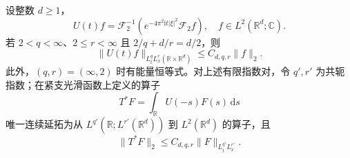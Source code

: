 \begin{theorem}\label{b2:thm:E-schrodinger-nonendpoint}
设整数 \(d\geq1\)，
\[
 U(t)f=\mathcal F_2^{-1}
       \left(e^{-4\pi^2\mathrm it|\xi|^2}\mathcal F_2f\right),
 \quad f\in L^2(\mathbb R^d;\mathbb C).
\]
若 \(2<q<\infty\)、\(2\leq r<\infty\) 且 \(2/q+d/r=d/2\)，则
\begin{equation}\label{b2:eq:E-homogeneous-strichartz}
 \|U(t)f\|_{L^q_tL^r_x(\mathbb R\times\mathbb R^d)}
 \leq C_{d,q,r}\|f\|_2.
\end{equation}
此外，\((q,r)=(\infty,2)\) 时有能量恒等式。对上述有限指数对，令 \(q',r'\) 为共轭指数；在紧支光滑函数上定义的算子
\[
 T^*F=\int_{\mathbb R}U(-s)F(s)\,\mathrm ds
\]
唯一连续延拓为从 \(L^{q'}(\mathbb R;L^{r'}(\mathbb R^d))\) 到 \(L^2(\mathbb R^d)\) 的算子，且
\begin{equation}\label{b2:eq:E-adjoint-bound}
 \|T^*F\|_2\leq C_{d,q,r}\|F\|_{L^{q'}_tL^{r'}_x}.
\end{equation}
\end{theorem}
